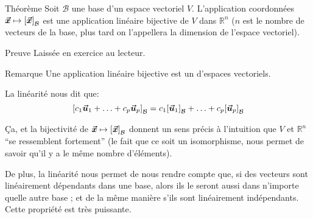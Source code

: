 \documentclass[a4paper]{article}
\begin{document}
\begin{parag}{Théorème}
    Soit $\mathcal{B}$ une base d'un espace vectoriel $V$. L'application coordonnées $\bvec{x} \mapsto \left[\bvec{x}\right]_{\mathcal{B}}$ est une application linéaire bijective de $V$ dans $\mathbb{R}^{n}$ ($n$ est le nombre de vecteurs de la base, plus tard on l'appellera la dimension de l'espace vectoriel).

    \begin{subparag}{Preuve}
        Laissée en exercice au lecteur.
    \end{subparag}

    \begin{subparag}{Remarque}
        Une application linéaire bijective est un  d'espaces vectoriels.

        La linéarité nous dit que:
        \[\left[c_1 \bvec{u}_1 + \ldots + c_p \bvec{u}_p\right]_{\mathcal{B}} = c_1 \left[\bvec{u}_1\right]_{\mathcal{B}} + \ldots + c_p \left[\bvec{u}_p\right]_{\mathcal{B}}\]

        Ça, et la bijectivité de $\bvec{x} \mapsto \left[\bvec{x}\right]_{\mathcal{B}}$ donnent un sens précis à l'intuition que $V$ et $\mathbb{R}^{n}$ ``se ressemblent fortement'' (le fait que ce soit un isomorphisme, nous permet de savoir qu'il y a le même nombre d'éléments).

        De plus, la linéarité nous permet de nous rendre compte que, si des vecteurs sont linéairement dépendants dans une base, alors ils le seront aussi dans n'importe quelle autre base ; et de la même manière s'ils sont linéairement indépendants. Cette propriété est très puissante.

    \end{subparag}
\end{parag}
\end{document}
